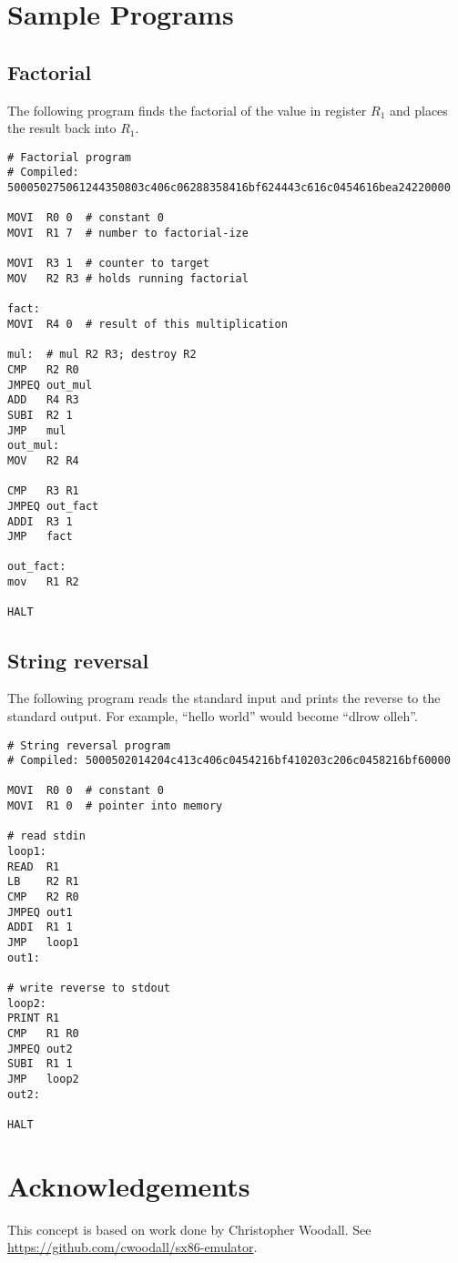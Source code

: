 \documentclass[12pt]{scrartcl}
\begin{document}
\section{Sample Programs}
\subsection{Factorial}
The following program finds the factorial of the value in register $R_1$ and places the result back into $R_1$.

\begin{lstlisting}
# Factorial program
# Compiled: 500050275061244350803c406c06288358416bf624443c616c0454616bea24220000

MOVI  R0 0  # constant 0
MOVI  R1 7  # number to factorial-ize

MOVI  R3 1  # counter to target
MOV   R2 R3 # holds running factorial

fact:
MOVI  R4 0  # result of this multiplication

mul:  # mul R2 R3; destroy R2
CMP   R2 R0
JMPEQ out_mul
ADD   R4 R3
SUBI  R2 1
JMP   mul
out_mul:
MOV   R2 R4

CMP   R3 R1
JMPEQ out_fact
ADDI  R3 1
JMP   fact

out_fact:
mov   R1 R2

HALT
\end{lstlisting}

\subsection{String reversal}
The following program reads the standard input and prints the reverse to the standard output. For example, ``hello world'' would become ``dlrow olleh''.

\begin{lstlisting}
# String reversal program
# Compiled: 5000502014204c413c406c0454216bf410203c206c0458216bf60000

MOVI  R0 0  # constant 0
MOVI  R1 0  # pointer into memory

# read stdin
loop1:
READ  R1
LB    R2 R1
CMP   R2 R0
JMPEQ out1
ADDI  R1 1
JMP   loop1
out1:

# write reverse to stdout
loop2:
PRINT R1
CMP   R1 R0
JMPEQ out2
SUBI  R1 1
JMP   loop2
out2:

HALT
\end{lstlisting}




\section{Acknowledgements}

This concept is based on work done by Christopher Woodall. See \url{https://github.com/cwoodall/sx86-emulator}.
\end{document}
